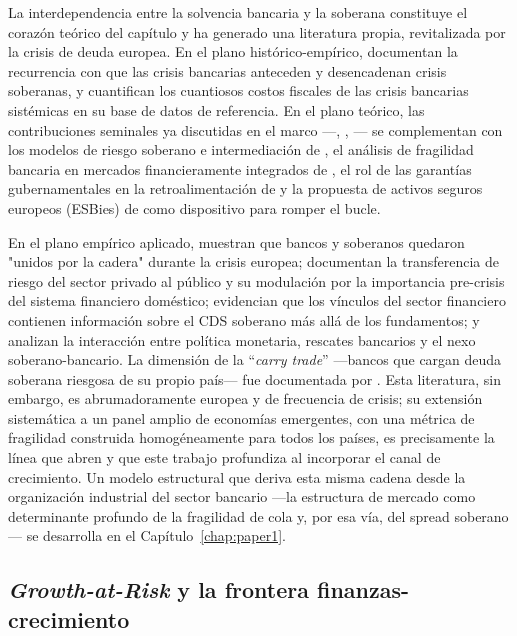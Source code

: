 La interdependencia entre la solvencia bancaria y la soberana constituye el corazón teórico del capítulo y ha generado una literatura propia, revitalizada por la crisis de deuda europea. En el plano histórico-empírico, \citet{ReinhartRogoff2009,ReinhartRogoff2011} documentan la recurrencia con que las crisis bancarias anteceden y desencadenan crisis soberanas, y \citet{LaevenValencia2013,LaevenValencia2020} cuantifican los cuantiosos costos fiscales de las crisis bancarias sistémicas en su base de datos de referencia. En el plano teórico, las contribuciones seminales ya discutidas en el marco —\citet{FarhiTirole2018b}, \citet{AcharyaDrechslerSchnabl2014b}, \citet{GennaioliMartinRossi2014}— se complementan con los modelos de riesgo soberano e intermediación de \citet{Bocola2016}, el análisis de fragilidad bancaria en mercados financieramente integrados de \citet{BoltonJeanne2011}, el rol de las garantías gubernamentales en la retroalimentación de \citet{Leonello2018} y la propuesta de activos seguros europeos (ESBies) de \citet{BrunnermeierEtAl2016} como dispositivo para romper el bucle.

En el plano empírico aplicado, \citet{ModySandri2012} muestran que bancos y soberanos quedaron "unidos por la cadera" durante la crisis europea; \citet{DieckmannPlank2012} documentan la transferencia de riesgo del sector privado al público y su modulación por la importancia pre-crisis del sistema financiero doméstico; \citet{KallestrupLandoMurgoci2016} evidencian que los vínculos del sector financiero contienen información sobre el CDS soberano más allá de los fundamentos; y \citet{FratzscherRieth2019} analizan la interacción entre política monetaria, rescates bancarios y el nexo soberano-bancario. La dimensión de la ``\textit{carry trade}'' —bancos que cargan deuda soberana riesgosa de su propio país— fue documentada por \citet{AcharyaSteffen2015}. Esta literatura, sin embargo, es abrumadoramente europea y de frecuencia de crisis; su extensión sistemática a un panel amplio de economías emergentes, con una métrica de fragilidad construida homogéneamente para todos los países, es precisamente la línea que abren \citet{Chari2024b} y que este trabajo profundiza al incorporar el canal de crecimiento. Un modelo estructural que deriva esta misma cadena desde la organización industrial del sector bancario —la estructura de mercado como determinante profundo de la fragilidad de cola y, por esa vía, del spread soberano— se desarrolla en el Capítulo~\ref{chap:paper1}.

\subsection{\textit{Growth-at-Risk} y la frontera finanzas-crecimiento}

